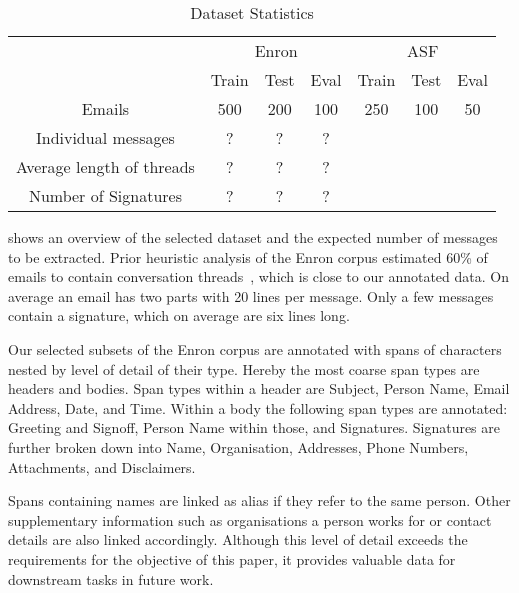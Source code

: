 \documentclass{llncs}
\begin{document}
\begin{table}
	\centering
	\caption{Dataset Statistics}
	\label{tab:dataset}
	
	\begin{tabular}{ccccccc}
		\toprule
		& \multicolumn{3}{c}{Enron} &  \multicolumn{3}{c}{ASF} \\
		\cmidrule(lr){2-4}
		\cmidrule(lr){5-7}
		& Train    & Test   & Eval   & Train   & Test   & Eval  \\
		\midrule
		Emails                    & 500      & 200    & 100    &   250   &  100   &   50  \\
		Individual messages       & ?        & ?      & ?      &         &        &       \\
		Average length of threads & ?        & ?      & ?      &         &        &       \\
		Number of Signatures      & ?        & ?      & ?      &         &        &       \\
		\bottomrule
	\end{tabular}
\end{table}

 shows an overview of the selected dataset and the expected number of messages to be extracted.
Prior heuristic analysis of the Enron corpus estimated 60\% of emails to contain conversation threads~\cite{enron}, which is close to our annotated data.
On average an email has two parts with 20 lines per message.
Only a few messages contain a signature, which on average are six lines long.

Our selected subsets of the Enron corpus are annotated with spans of characters nested by level of detail of their type.
Hereby the most coarse span types are headers and bodies.
Span types within a header are Subject, Person Name, Email Address, Date, and Time.
Within a body the following span types are annotated: Greeting and Signoff, Person Name within those, and Signatures. Signatures are further broken down into Name, Organisation, Addresses, Phone Numbers, Attachments, and Disclaimers.

Spans containing names are linked as alias if they refer to the same person.
Other supplementary information such as organisations a person works for or contact details are also linked accordingly.
Although this level of detail exceeds the requirements for the objective of this paper, it provides valuable data for downstream tasks in future work.

\end{document}
